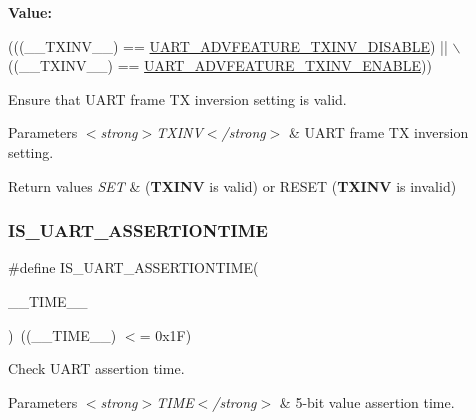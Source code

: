 {\bfseries Value\+:}
\begin{DoxyCode}
(((\_\_TXINV\_\_) == \hyperlink{group___u_a_r_t___tx___inv_gaf2ef53664b0d4b93758575b9ee1b949b}{UART\_ADVFEATURE\_TXINV\_DISABLE}) || \(\backslash\)
                                             ((\_\_TXINV\_\_) == 
      \hyperlink{group___u_a_r_t___tx___inv_ga1e0ddbed5fc5ddce5314f63e96e29c3d}{UART\_ADVFEATURE\_TXINV\_ENABLE}))
\end{DoxyCode}


Ensure that U\+A\+RT frame TX inversion setting is valid. 


\begin{DoxyParams}{Parameters}
{\em $<$strong$>$\+T\+X\+I\+N\+V$<$/strong$>$} & U\+A\+RT frame TX inversion setting. \\
\hline
\end{DoxyParams}

\begin{DoxyRetVals}{Return values}
{\em S\+ET} & ({\bfseries T\+X\+I\+NV} is valid) or R\+E\+S\+ET ({\bfseries T\+X\+I\+NV} is invalid) \\
\hline
\end{DoxyRetVals}
\mbox{\label{group___u_a_r_t___private___macros_ga8acf6b6648717b7192439f1b426321a4}} 
\subsubsection{\texorpdfstring{I\+S\+\_\+\+U\+A\+R\+T\+\_\+\+A\+S\+S\+E\+R\+T\+I\+O\+N\+T\+I\+ME}{IS\_UART\_ASSERTIONTIME}}
{\footnotesize\ttfamily \#define I\+S\+\_\+\+U\+A\+R\+T\+\_\+\+A\+S\+S\+E\+R\+T\+I\+O\+N\+T\+I\+ME(\begin{DoxyParamCaption}\item[{}]{\+\_\+\+\_\+\+T\+I\+M\+E\+\_\+\+\_\+ }\end{DoxyParamCaption})~((\+\_\+\+\_\+\+T\+I\+M\+E\+\_\+\+\_\+) $<$= 0x1\+F)}



Check U\+A\+RT assertion time. 


\begin{DoxyParams}{Parameters}
{\em $<$strong$>$\+T\+I\+M\+E$<$/strong$>$} & 5-\/bit value assertion time. \\
\hline
\end{DoxyParams}

